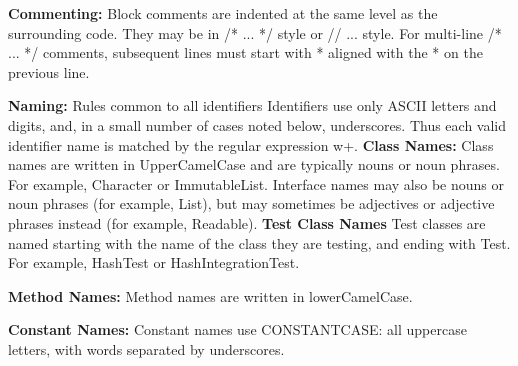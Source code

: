 \documentclass[12pt]{report}
\begin{document}
\noindent
\textbf{Commenting:} \newline
Block comments are indented at the same level as the surrounding code. They may be in /* ... */ style or // ... style. For multi-line /* ... */ comments, subsequent lines must start with * aligned with the * on the previous line.
\newline

\noindent
\textbf{Naming:} \newline
\noindent
Rules common to all identifiers
\noindent
Identifiers use only ASCII letters and digits, and, in a small number of cases noted below, underscores. Thus each valid identifier name is matched by the regular expression w+. \newline
\textbf{Class Names:} \newline
\noindent
Class names are written in UpperCamelCase and are typically nouns or noun phrases. For example, Character or ImmutableList. Interface names may also be nouns or noun phrases (for example, List), but may sometimes be adjectives or adjective phrases instead (for example, Readable).\newline
\textbf{Test Class Names} \newline
\noindent
Test classes are named starting with the name of the class they are testing, and ending with Test. For example, HashTest or HashIntegrationTest.

\noindent
\textbf{Method Names:} \newline
\noindent
Method names are written in lowerCamelCase.

\noindent
\textbf{Constant Names:} \newline
\noindent
Constant names use CONSTANT\textunderscore CASE: all uppercase letters, with words separated by underscores.
\end{document}
